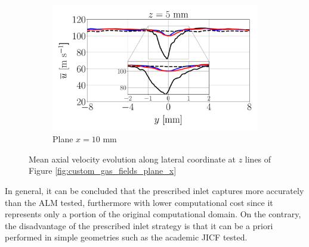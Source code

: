 \begin{figure}[ht]
\begin{subfigure}[b]{1.0\textwidth}
   \includegraphics[scale=0.24]{./part2_developments/figures_ch6_lagrangian_JICF/gas_field_initial_conditions/custom_line_x10_z05p0_ux_mean_along_y}
   \vspace*{-0.1in}
	\caption{Plane $x = 10$ mm}
\end{subfigure}
   \caption{Mean axial velocity evolution along lateral coordinate at $z$ lines of Figure \ref{fig:custom_gas_fields_plane_x}}
\label{fig:JICF_custom_lines_iso-x_along_y_ux_mean}
\end{figure}

In general, it can be concluded that the prescribed inlet captures more accurately than the ALM tested, furthermore with lower computational cost since it represents only a portion of the original computational domain. On the contrary, the disadvantage of the prescribed inlet strategy is that it can be a priori performed in simple geometries such as the academic JICF tested. 

%
%

